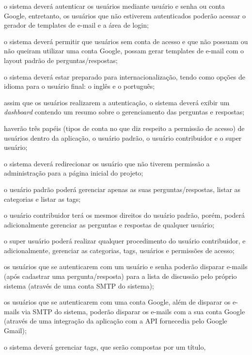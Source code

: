 \begin{alineas}
	\item o sistema deverá autenticar os usuários mediante usuário e senha ou
	conta Google, entretanto, os usuários que não estiverem autenticados poderão
	acessar o gerador de templates de e-mail e a área de login;
	\item o sistema deverá permitir que usuários sem conta de acesso e que não
	possuam ou não queiram utilizar uma conta Google, possam gerar templates de
	e-mail com o layout padrão de perguntas/respostas;
    \item o sistema deverá estar preparado para internacionalização, tendo como
    opções de idioma para o usuário final: o inglês e o português;
    \item assim que os usuários realizarem a autenticação, o sistema deverá
    exibir um \textit{dashboard} contendo um resumo sobre o gerenciamento das
    perguntas e respostas;
    \item haverão três papéis (tipos de conta no que diz respeito a permissão
    de acesso) de usuários dentro da aplicação, o usuário padrão, o usuário
    contribuidor e o super usuário;
    \item o sistema deverá redirecionar os usuário que não tiverem permissão a
    administração para a página inicial do projeto;
    \item o usuário padrão poderá gerenciar apenas as suas perguntas/respostas,
    listar as categorias e listar as tags;
    \item o usuário contribuidor terá os mesmos direitos do usuário padrão,
    porém, poderá adicionalmente gerenciar as perguntas e respostas de qualquer
    usuário;
    \item o super usuário poderá realizar qualquer procedimento do usuário
    contribuidor, e adicionalmente, gerenciar as categorias, tags, usuários e
    permissões de acesso;
    \item os usuários que se autenticarem com um usuário e senha poderão
    disparar e-mails (após cadastrar uma pergunta/resposta) para a lista de
    discussão pelo próprio sistema (através de uma conta SMTP do sistema);
    \item os usuários que se autenticarem com uma conta Google, além de disparar
    os e-mails via SMTP do sistema, poderão disparar os e-mails com a sua conta
    Google (através de uma integração da aplicação com a API fornecedia pelo
    Google Gmail);
    \item o sistema deverá gerenciar tags, que serão compostas por um título,

\end{alineas}
